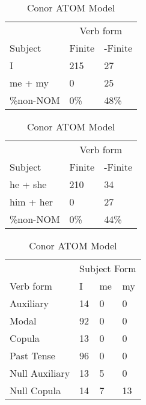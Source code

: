\begin{table}[]
    \caption{Conor ATOM Model}
    \begin{minipage}{0.5\textwidth}
    \centering
    \begin{tabular}{@{}lll@{}}
        \toprule
         &\multicolumn{2}{c}{Verb form}\\
         \cline{2-3}
        Subject & Finite & -Finite \\
        \midrule
        I & 215 & 27 \\
        me + my & 0 & 25 \\
        \hline
        \%non-NOM & 0\% & 48\% \\
        \bottomrule
    \end{tabular}
\end{minipage}
\begin{minipage}{0.5\textwidth}
    \centering
    \begin{tabular}{@{}lll@{}}
        \toprule
         &\multicolumn{2}{c}{Verb form}\\
         \cline{2-3}
        Subject & Finite & -Finite \\
        \midrule
        he + she & 210 & 34 \\
        him + her & 0 & 27 \\
        \hline
        \%non-NOM & 0\% & 44\% \\
        \bottomrule
    \end{tabular}
    \end{minipage}
    \begin{minipage}{0.5\textwidth}
    \centering
    \begin{tabular}{@{}llll@{}}
        \toprule
            &\multicolumn{3}{l}{Subject Form}\\
            \cline{2-4}
        Verb form & I & me & my \\
        \midrule
        Auxiliary & 14 & 0 & 0 \\
        Modal & 92 & 0 & 0 \\
        Copula & 13 & 0 & 0 \\
        Past Tense & 96 & 0 & 0 \\
        \hline
        Null Auxiliary & 13 & 5 & 0 \\
        Null Copula & 14 & 7 & 13 \\
        \bottomrule
    \end{tabular}

\end{minipage}
\end{table}
